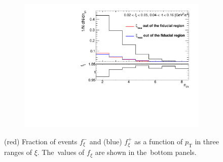 \begin{figure}[b!]
\begin{subfigure}{.49\textwidth}
		\includegraphics[width=\textwidth,page=6]{chapters/chrgSTAR/img/xiMigration/xi.pdf}
	\end{subfigure}
	\hfill
	\begin{minipage}{.47\textwidth}
		\caption{(red) Fraction of events $f_{\xi}^-$ and (blue) $f_{\xi}^+$  as a function of $p_\textrm{T}$ in three ranges of $\xi$. The~values of $f_{\xi}$ are shown in the~bottom panels.}
		\label{fig:xi_correction_pt}
	\end{minipage}
\end{figure}	
